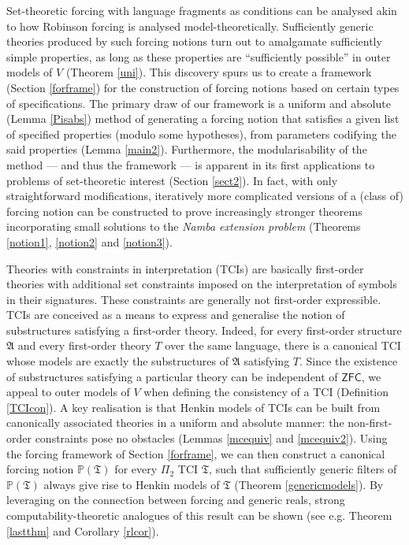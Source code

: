 \documentclass[12pt, twoside]{memoir}
\numberwithin{equation}{section}
\theoremstyle{definition}
\theoremstyle{remark}
\theoremstyle{definition}
\theoremstyle{definition}
\theoremstyle{definition}
\theoremstyle{remark}
\begin{document}
Set-theoretic forcing with language fragments as conditions can be analysed akin to how Robinson forcing is analysed model-theoretically. Sufficiently generic theories produced by such forcing notions turn out to amalgamate sufficiently simple properties, as long as these properties are ``sufficiently possible'' in outer models of $V$ (Theorem \ref{uni}). This discovery spurs us to create a framework (Section \ref{forframe}) for the construction of forcing notions based on certain types of specifications. The primary draw of our framework is a uniform and absolute (Lemma \ref{Pisabs}) method of generating a forcing notion that satisfies a given list of specified properties (modulo some hypotheses), from parameters codifying the said properties (Lemma \ref{main2}). Furthermore, the modularisability of the method --- and thus the framework --- is apparent in its first applications to problems of set-theoretic interest (Section \ref{sect2}). In fact, with only straightforward modifications, iteratively more complicated versions of a (class of) forcing notion can be constructed to prove increasingly stronger theorems incorporating small solutions to the \textit{Namba extension problem} (Theorems \ref{notion1}, \ref{notion2} and \ref{notion3}).

Theories with constraints in interpretation (TCIs) are basically first-order theories with additional set constraints imposed on the interpretation of symbols in their signatures. These constraints are generally not first-order expressible. TCIs are conceived as a means to express and generalise the notion of substructures satisfying a first-order theory. Indeed, for every first-order structure $\mathfrak{A}$ and every first-order theory $T$ over the same language, there is a canonical TCI whose models are exactly the substructures of $\mathfrak{A}$ satisfying $T$. Since the existence of substructures satisfying a particular theory can be independent of $\mathsf{ZFC}$, we appeal to outer models of $V$ when defining the consistency of a TCI (Definition \ref{TCIcon}). A key realisation is that Henkin models of TCIs can be built from canonically associated theories in a uniform and absolute manner: the non-first-order constraints pose no obstacles (Lemmas \ref{mcequiv} and \ref{mcequiv2}). Using the forcing framework of Section \ref{forframe}, we can then construct a canonical forcing notion $\mathbb{P}(\mathfrak{T})$ for every $\Pi_2$ TCI $\mathfrak{T}$, such that sufficiently generic filters of $\mathbb{P}(\mathfrak{T})$ always give rise to Henkin models of $\mathfrak{T}$ (Theorem \ref{genericmodels}). By leveraging on the connection between forcing and generic reals, strong computability-theoretic analogues of this result can be shown (see e.g. Theorem \ref{lastthm} and Corollary \ref{rlcor}).
\end{document}
